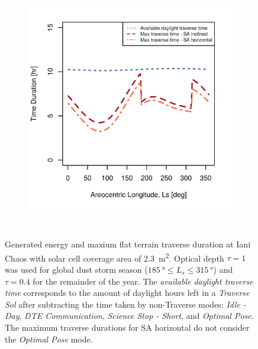 \begin{figure}[h]
\begin{subfigure}[t]{\subfigureWidth}
        \includegraphics[height=\graphicsHeight]{sections/design/solar-array/plots/ianichaos-75w-max-traverse-durations-for-solar-cell-coverage-area-23m2.png}
		\label{fig:plot:sub:iani-chaos-max-traverse-durations}
	\end{subfigure}\\[0.8ex]
    \caption[Generated energy and maxium flat terrain traverse durations at Iani Chaos]
            {Generated energy and maxium flat terrain traverse duration at Iani Chaos with solar cell coverage area of \SI{2.3}{m^{2}}. Optical depth  $\tau = 1$ was used for global dust storm season ($\SI{185}{\degree} \leq L_{s} \leq \SI{315}{\degree}$) and $\tau = 0.4$ for the remainder of the year. The \textit{available daylight traverse time} corresponds to the amount of daylight hours left in a \textit{Traverse Sol} after subtracting the time taken by non-Traverse modes: \textit{Idle - Day}, \textit{\ac{DTE} Communication}, \textit{Science Stop - Short}, and \textit{Optimal Pose}. The maximum traverse durations for \ac{SA} horizontal do not consider the \textit{Optimal Pose} mode.}
    \label{fig:plot:iani-chaos-generated-energy-and-max-traverse-durations}
\vspace{-2ex}
\end{figure}


